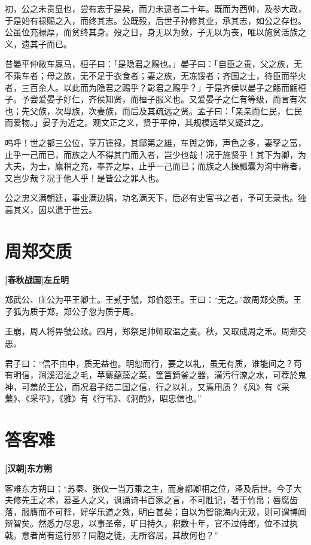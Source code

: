 \documentclass[UTF8,titlepage,oneside]{ctexbook}
\begin{document}
初，公之未贵显也，尝有志于是矣，而力未逮者二十年。既而为西帅，及参大政，于是始有禄赐之入，而终其志。公既殁，后世子孙修其业，承其志，如公之存也。公虽位充禄厚，而贫终其身。殁之日，身无以为敛，子无以为丧，唯以施贫活族之义，遗其子而已。

昔晏平仲敝车羸马，桓子曰：「是隐君之赐也。」晏子曰：「自臣之贵，父之族，无不乘车者；母之族，无不足于衣食者；妻之族，无冻馁者；齐国之士，待臣而举火者，三百余人。以此而为隐君之赐乎？彰君之赐乎？」于是齐侯以晏子之觞而觞桓子。予尝爱晏子好仁，齐侯知贤，而桓子服义也。又爱晏子之仁有等级，而言有次也；先父族，次母族，次妻族，而后及其疏远之贤。孟子曰：「亲亲而仁民，仁民而爱物。」晏子为近之。观文正之义，贤于平仲，其规模远举又疑过之。

呜呼！世之都三公位，享万锺禄，其邸第之雄，车舆之饰，声色之多，妻孥之富，止乎一己而已，而族之人不得其门而入者，岂少也哉！况于施贤乎！其下为卿，为大夫，为士，廪稍之充，奉养之厚，止乎一己而已；而族之人操瓢囊为沟中瘠者，又岂少哉？况于他人乎！是皆公之罪人也。

公之忠义满朝廷，事业满边隅，功名满天下，后必有史官书之者，予可无录也。独高其义，因以遗于世云。


\chapter*{周郑交质}
\begin{center}
	\textbf{[春秋战国]左丘明}
\end{center}


郑武公、庄公为平王卿士。王贰于虢，郑伯怨王。王曰：“无之。”故周郑交质。王子狐为质于郑，郑公子忽为质于周。


王崩，周人将畀虢公政。四月，郑祭足帅师取温之麦。秋，又取成周之禾。周郑交恶。


君子曰：“信不由中，质无益也。明恕而行，要之以礼，虽无有质，谁能间之？苟有明信，涧溪沼沚之毛，苹蘩蕴藻之菜，筐筥錡釜之器，潢污行潦之水，可荐於鬼神，可羞於王公，而况君子结二国之信，行之以礼，又焉用质？《风》有《采蘩》、《采苹》，《雅》有《行苇》、《泂酌》，昭忠信也。”



\chapter*{答客难}
\begin{center}
	\textbf{[汉朝]东方朔}
\end{center}


客难东方朔曰：“苏秦、张仪一当万乘之主，而身都卿相之位，泽及后世。今子大夫修先王之术，慕圣人之义，讽诵诗书百家之言，不可胜记，著于竹帛；唇腐齿落，服膺而不可释，好学乐道之效，明白甚矣；自以为智能海内无双，则可谓博闻辩智矣。然悉力尽忠，以事圣帝，旷日持久，积数十年，官不过侍郎，位不过执戟。意者尚有遗行邪？同胞之徒，无所容居，其故何也？”
\end{document}

